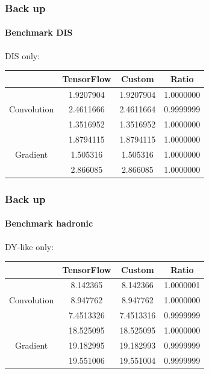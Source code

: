 \documentclass[aspectratio=43]{beamer}
\begin{document}
\begin{frame}

	\footnotesize
	
	\frametitle{Back up}
	\framesubtitle{Benchmark DIS}
	
	{\Large DIS only:}
	\begin{table}
		\centering
		\begin{tabular}{c c c c}
			& TensorFlow & Custom & Ratio \\ \hline
			& 1.9207904 & 1.9207904 & {\color{darkgreen} 1.0000000} \\
			Convolution & 2.4611666 & 2.4611664 & {\color{darkgreen} 0.9999999} \\
			& 1.3516952 & 1.3516952 & {\color{darkgreen} 1.0000000} \\
			\hline
			& 1.8794115 & 1.8794115 & {\color{darkgreen} 1.0000000} \\
			Gradient & 1.505316 & 1.505316 & {\color{darkgreen} 1.0000000} \\
			& 2.866085 & 2.866085 & {\color{darkgreen} 1.0000000} \\
			\hline
		\end{tabular}
	\end{table}

\end{frame}

\begin{frame}
	
	\footnotesize
	
	\frametitle{Back up}
	\framesubtitle{Benchmark hadronic}
	
	{\Large DY-like only:}
	\begin{table}
	\centering
	\begin{tabular}{c c c c}
		& TensorFlow & Custom & Ratio \\ \hline
		& 8.142365 & 8.142366 & {\color{darkgreen} 1.0000001} \\
		Convolution & 8.947762 & 8.947762 & {\color{darkgreen} 1.0000000} \\
		& 7.4513326 & 7.4513316 & {\color{darkgreen} 0.9999999} \\
		\hline
		& 18.525095 & 18.525095 & {\color{darkgreen} 1.0000000} \\
		Gradient & 19.182995 & 19.182993 & {\color{darkgreen} 0.9999999} \\
		& 19.551006 & 19.551004 & {\color{darkgreen} 0.9999999} \\
		\hline
	\end{tabular}
	\end{table}

\end{frame}
\end{document}
